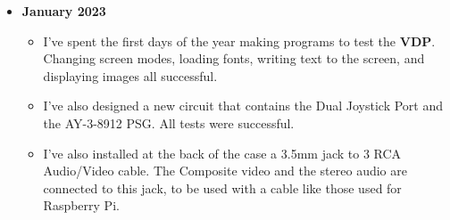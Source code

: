 \documentclass[a4paper,11pt]{article}
\begin{document}
\begin{itemize}
\begin{itemize}
\begin{itemize}
                board to a DC-DC converter 5V/2A and all was working. Sprites
                and correct text lines. But a huge rippled image on the screen.
                \item Testing with another power supply brought crispy image.
                It seems those DC-DC step down converters I bought have a big
                voltage ripple on the output.
                \item Also, image on CRT was B/N, due to signal being NTSC. But
                with the addition of a  NTSC-to-PAL converter all looks fine.
            \end{itemize}
            \item Testing the VDP board with the dastaz80 was successful, though
            there are some artifacts on the screen. Looking at the contents of
            the \textbf{VRAM} with the \textit{vramdump} program, I can see that
            in the Colour Table some bytes have the value \textit{0xF1}, which
            is the value I initialised the Colour Table with. So it seems some
            skipping is happening. I added \textit{NOP} instructions, but no
            change so far. And why only happens with the Colour Table?
            \item Found that the VDP needs 2 \si{\micro\second} to read or write
            a byte to its RAM. A \textit{NOP} instruction at 7.3728 Mhz only
            takes 0.54 \si{\micro\second}, so I need at least four \textit{NOP}s.
            Instead I went for creating a subroutine, that with its instructions
            plus the \textit{call} takes 6.24 \si{\micro\second}
            \item Last day of the year! I built and tested successfully a
            circuit for the Dual Joystick Port.
        \end{itemize}
        \item \textbf{January 2023}
        \begin{itemize}
            \item I've spent the first days of the year making programs to test
            the \textbf{VDP}. Changing screen modes, loading fonts, writing text
            to the screen, and displaying images all successful.
            \item I've also designed a new circuit that contains the Dual
            Joystick Port and the AY-3-8912 PSG. All tests were successful.
            \item I've also installed at the back of the case a 3.5mm jack to
            3 RCA Audio/Video cable. The Composite video and the stereo audio
            are connected to this jack, to be used with a cable like those used
            for  Raspberry Pi.
        \end{itemize}
    \end{itemize}
\end{document}
